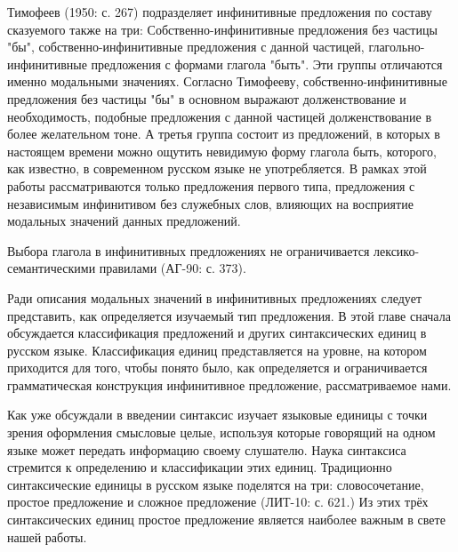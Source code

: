 Тимофеев (1950: с. 267) подразделяет инфинитивные предложения по составу сказуемого также на три: Собственно-инфинитивные предложения без частицы "бы", собственно-инфинитивные предложения с данной частицей, глагольно-инфинитивные предложения с формами глагола "быть". Эти группы отличаются именно модальными значениях. Согласно Тимофееву, собственно-инфинитивные предложения без частицы "бы" в основном выражают долженствование и необходимость, подобные предложения с данной частицей долженствование в более желательном тоне. А третья группа состоит из предложений, в которых в настоящем времени можно ощутить невидимую форму глагола быть, которого, как известно, в современном русском языке не употребляется. В рамках этой работы рассматриваются только предложения первого типа, предложения с независимым инфинитивом без служебных слов, влияющих на восприятие модальных значений данных предложений. 


Выбора глагола в инфинитивных предложениях не ограничивается лексико-семантическими правилами (АГ-90: с. 373).



Ради описания модальных значений в инфинитивных предложениях следует представить, как определяется изучаемый тип предложения. В этой главе сначала обсуждается классификация предложений и других синтаксических единиц в русском языке. Классификация единиц представляется на уровне, на котором приходится для того, чтобы понято было, как определяется и ограничивается грамматическая конструкция инфинитивное предложение, рассматриваемое нами.

Как уже обсуждали в введении синтаксис изучает языковые единицы с точки зрения оформления смысловые целые, используя которые говорящий на одном языке может передать информацию своему слушателю. Наука синтаксиса стремится к определению и классификации этих единиц. Традиционно синтаксические единицы в русском языке поделятся на три: словосочетание, простое предложение и сложное предложение (ЛИТ-10: с. 621.) Из этих трёх синтаксических единиц простое предложение является наиболее важным в свете нашей работы.


